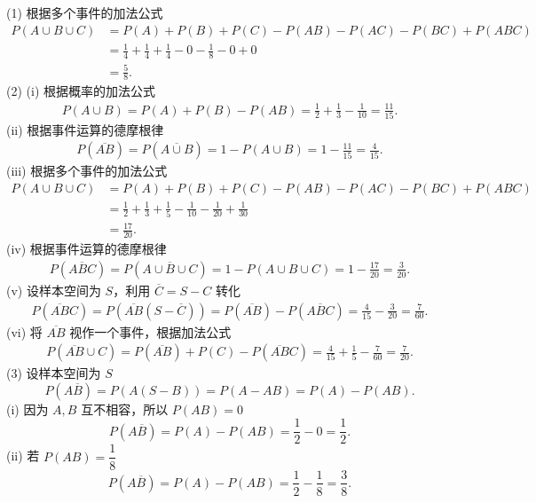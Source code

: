 \begin{solution}
    (1) 根据多个事件的加法公式
    $$
        \begin{aligned}
            P(A \cup B \cup C)
             & = P(A) + P(B) + P(C) - P(AB) - P(AC) - P(BC) + P(ABC)              \\
             & = \frac{1}{4} + \frac{1}{4} + \frac{1}{4}- 0 - \frac{1}{8} - 0 + 0 \\
             & = \frac{5}{8}.
        \end{aligned}
    $$
    (2) (i) 根据概率的加法公式
    $$
        \begin{aligned}
            P(A \cup B)
            = P(A) + P(B) - P(AB)
            = \frac{1}{2} + \frac{1}{3} - \frac{1}{10}
            = \frac{11}{15}.
        \end{aligned}
    $$
    (ii) 根据事件运算的德摩根律
    $$
        \begin{aligned}
            P\left(\overline{AB}\right)
            = P\left(\overline{A \cup B}\right) = 1-P(A \cup B)
            = 1-\frac{11}{15} = \frac{4}{15}.
        \end{aligned}
    $$
    (iii) 根据多个事件的加法公式
    $$
        \begin{aligned}
            P(A \cup B \cup C)
             & = P(A) + P(B) + P(C) - P(AB) - P(AC) - P(BC) + P(ABC)                                \\
             & = \frac{1}{2} + \frac{1}{3} + \frac{1}{5} - \frac{1}{10}-\frac{1}{20} + \frac{1}{30} \\
             & = \frac{17}{20}.
        \end{aligned}
    $$
    (iv) 根据事件运算的德摩根律
    $$
        \begin{aligned}
            P\left(\overline{ABC}\right)
            = P\left(\overline{A \cup B \cup C}\right)
            = 1 - P(A \cup B \cup C)
            = 1 - \frac{17}{20}
            = \frac{3}{20}.
        \end{aligned}
    $$
    (v) 设样本空间为 $S$，利用 $\overline{C} = S - C$ 转化
    $$
        \begin{aligned}
            P(\overline{AB}C)
            = P\left(\overline{AB}(S-\overline{C})\right)
            = P\left(\overline{AB}\right) - P\left(\overline{ABC}\right)
            = \frac{4}{15} - \frac{3}{20}
            = \frac{7}{60}.
        \end{aligned}
    $$
    (vi) 将 $\overline{AB}$ 视作一个事件，根据加法公式
    $$
        \begin{aligned}
            P(\overline{AB}\cup C)
            = P(\overline{AB}) + P(C) - P(\overline{AB}C)
            = \frac{4}{15} + \frac{1}{5} - \frac{7}{60}
            = \frac{7}{20}.
        \end{aligned}
    $$
    (3) 设样本空间为 $S$
    $$
        P(A\overline{B}) = P(A(S-B)) = P(A - AB) = P(A) - P(AB).
    $$
    (i) 因为 $A,B$ 互不相容，所以 $P(AB) = 0$
    $$
        P(A\overline{B}) = P(A) - P(AB) = \frac{1}{2} - 0 = \frac{1}{2}.
    $$
    (ii) 若 $P(AB) = \dfrac{1}{8}$
    $$
        P(A\overline{B})
        = P(A)-P(AB)
        = \frac{1}{2}-\frac{1}{8}
        = \frac{3}{8}.
    $$
\end{solution}

